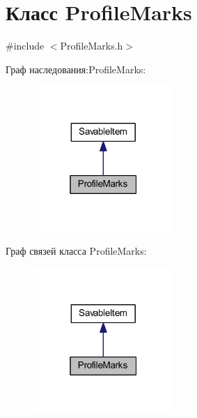 \hypertarget{class_profile_marks}{\section{Класс Profile\-Marks}
\label{class_profile_marks}
}


{\ttfamily \#include $<$Profile\-Marks.\-h$>$}



Граф наследования\-:Profile\-Marks\-:
\nopagebreak
\begin{figure}[H]
\begin{center}
\leavevmode
\includegraphics[width=151pt]{class_profile_marks__inherit__graph}
\end{center}
\end{figure}


Граф связей класса Profile\-Marks\-:
\nopagebreak
\begin{figure}[H]
\begin{center}
\leavevmode
\includegraphics[width=151pt]{class_profile_marks__coll__graph}
\end{center}
\end{figure}
